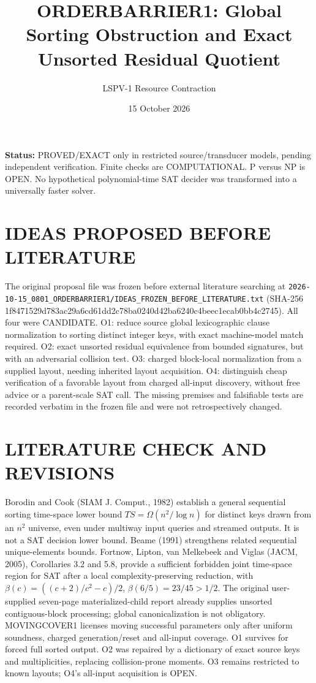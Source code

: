 \documentclass{article}
\title{ORDERBARRIER1: Global Sorting Obstruction and Exact Unsorted Residual Quotient}
\author{LSPV-1 Resource Contraction}
\date{15 October 2026}
\begin{document}
\maketitle
\textbf{Status:} PROVED/EXACT only in restricted source/transducer models, pending independent verification. Finite checks are COMPUTATIONAL. P versus NP is OPEN. No hypothetical polynomial-time SAT decider was transformed into a universally faster solver.
\section{IDEAS PROPOSED BEFORE LITERATURE}
The original proposal file was frozen before external literature searching at \texttt{2026-10-15\_0801\_ORDERBARRIER1/IDEAS\_FROZEN\_BEFORE\_LITERATURE.txt} (SHA-256 1f8471529d783ac29a6cd61dd2c78ba0240d42ba6240c4beec1ecab0bb4c2745). All four were CANDIDATE. O1: reduce source global lexicographic clause normalization to sorting distinct integer keys, with exact machine-model match required. O2: exact unsorted residual equivalence from bounded signatures, but with an adversarial collision test. O3: charged block-local normalization from a supplied layout, needing inherited layout acquisition. O4: distinguish cheap verification of a favorable layout from charged all-input discovery, without free advice or a parent-scale SAT call. The missing premises and falsifiable tests are recorded verbatim in the frozen file and were not retrospectively changed.
\section{LITERATURE CHECK AND REVISIONS}
Borodin and Cook (SIAM J. Comput., 1982) establish a general sequential sorting time-space lower bound $TS=\Omega(n^2/\log n)$ for distinct keys drawn from an $n^2$ universe, even under multiway input queries and streamed outputs. It is not a SAT decision lower bound. Beame (1991) strengthens related sequential unique-elements bounds. Fortnow, Lipton, van Melkebeek and Viglas (JACM, 2005), Corollaries 3.2 and 5.8, provide a sufficient forbidden joint time-space region for SAT after a local complexity-preserving reduction, with $\beta(c)=((c+2)/c^2-c)/2$, $\beta(6/5)=23/45>1/2$. The original user-supplied seven-page materialized-child report already supplies unsorted contiguous-block processing; global canonicalization is not obligatory. MOVINGCOVER1 licenses moving successful parameters only after uniform soundness, charged generation/reset and all-input coverage. O1 survives for forced full sorted output. O2 was repaired by a dictionary of exact source keys and multiplicities, replacing collision-prone moments. O3 remains restricted to known layouts; O4's all-input acquisition is OPEN.
\end{document}
